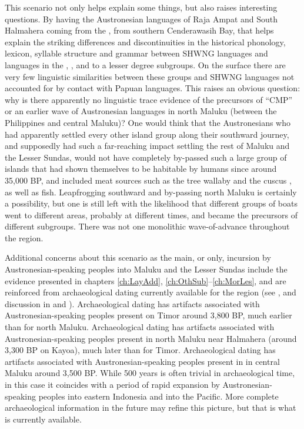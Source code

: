 This scenario not only helps explain some things,
but also raises interesting questions.
By having the Austronesian languages of Raja Ampat
and South Halmahera coming from the ,
from southern Cenderawasih Bay,
that helps explain the striking differences
and discontinuities in the historical phonology,
lexicon, syllable structure and grammar between SHWNG languages
and languages in the ,
, and to a lesser degree  subgroups.
On the surface there are very few linguistic similarities between
these groups and SHWNG languages not accounted for by contact with Papuan languages.
This raises an obvious question: why is there apparently no linguistic
trace evidence of the precursors of “CMP” or an earlier wave
of Austronesian languages in north Maluku (between the Philippines
and central Maluku)? One would think that the Austronesians who
had apparently settled every other island group along their southward
journey, and supposedly had such a far-reaching impact settling the rest
of Maluku and the Lesser Sundas,
would not have completely by-passed such a large group of islands
that had shown themselves to be habitable by humans since around
35,000 BP, and included meat sources such as the tree wallaby
and the cuscus \citep{Bellwood2019a},
as well as fish.
Leapfrogging southward and by-passing north Maluku is certainly
a possibility, but one is still left with the likelihood that different groups
of boats went to different areas,
probably at different times,
and became the precursors of different subgroups.
There was not one monolithic wave-of-advance throughout the region.

Additional concerns about this scenario as the main, or only, incursion
by Austronesian-speaking peoples into Maluku
and the Lesser Sundas include the evidence presented in chapters
\ref{ch:LayAdd}, \ref{ch:OthSub}--\ref{ch:MorLes},
and are reinforced from archaeological dating currently
available for the region (see \citealp{Spriggs2011,Bellwood2019ed},
and discussion in  and ).
Archaeological dating has artifacts associated with Austronesian-speaking
peoples present on Timor around 3,800 BP,
much earlier than for north Maluku.
Archaeological dating has artifacts associated with Austronesian-speaking
peoples present in north Maluku near Halmahera (around 3,300
BP on Kayoa), much later than for Timor.
Archaeological dating has artifacts associated with Austronesian-speaking
peoples present in  in central Maluku around 3,500 BP.
While 500 years is often trivial in archaeological time,
in this case it coincides with a period of rapid expansion by
Austronesian-speaking peoples into eastern Indonesia
and into the Pacific.
More complete archaeological information in the future may refine
this picture, but that is what is currently available.

